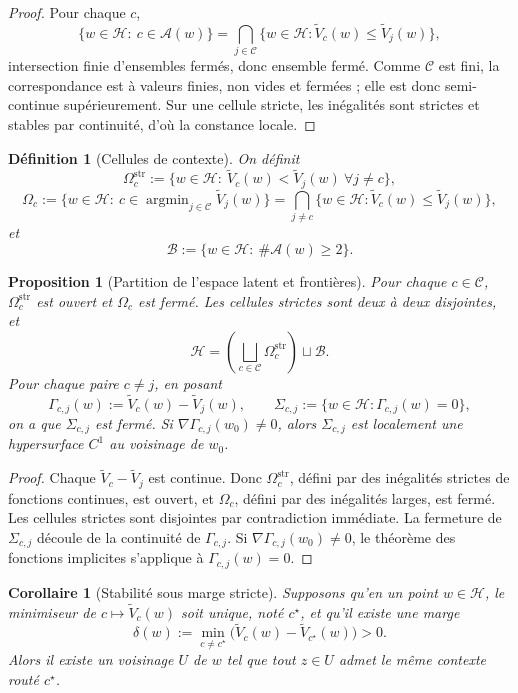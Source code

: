 \documentclass[11pt,a4paper]{article}
\newtheorem{definition}{Définition}[section]
\newtheorem{proposition}{Proposition}[section]
\newtheorem{corollary}{Corollaire}[section]
\DeclareMathOperator{\argmin}{argmin}
\newcommand{\Hh}{\mathcal H}
\newcommand{\Ccal}{\mathcal C}
\newcommand{\Acal}{\mathcal A}
\newcommand{\Bcal}{\mathcal B}
\begin{document}
\begin{proof}
Pour chaque \(c\),
\[
\{w\in\Hh:\ c\in\Acal(w)\}
=
\bigcap_{j\in\Ccal}\{w\in\Hh:\widetilde V_c(w)\le \widetilde V_j(w)\},
\]
intersection finie d'ensembles fermés, donc ensemble fermé. Comme \(\Ccal\) est fini, la correspondance est à valeurs finies, non vides et fermées ; elle est donc semi-continue supérieurement. Sur une cellule stricte, les inégalités sont strictes et stables par continuité, d'où la constance locale.
\end{proof}

\begin{definition}[Cellules de contexte]
On définit
\[
\Omega_c^{\mathrm{str}}:=\{w\in\Hh:\ \widetilde V_c(w)<\widetilde V_j(w)\ \forall j\neq c\},
\]
\[
\Omega_c:=\{w\in\Hh:\ c\in\argmin_{j\in\Ccal}\widetilde V_j(w)\}
=\bigcap_{j\neq c}\{w\in\Hh:\widetilde V_c(w)\le \widetilde V_j(w)\},
\]
et
\[
\Bcal:=\{w\in\Hh:\ \#\Acal(w)\ge 2\}.
\]
\end{definition}

\begin{proposition}[Partition de l'espace latent et frontières]
Pour chaque \(c\in\Ccal\), \(\Omega_c^{\mathrm{str}}\) est ouvert et \(\Omega_c\) est fermé. Les cellules strictes sont deux à deux disjointes, et
\[
\Hh=\left(\bigsqcup_{c\in\Ccal}\Omega_c^{\mathrm{str}}\right)\sqcup \Bcal.
\]
Pour chaque paire \(c\neq j\), en posant
\[
\Gamma_{c,j}(w):=\widetilde V_c(w)-\widetilde V_j(w),
\qquad
\Sigma_{c,j}:=\{w\in\Hh:\Gamma_{c,j}(w)=0\},
\]
on a que \(\Sigma_{c,j}\) est fermé. Si \(\nabla\Gamma_{c,j}(w_0)\neq 0\), alors \(\Sigma_{c,j}\) est localement une hypersurface \(C^1\) au voisinage de \(w_0\).
\end{proposition}

\begin{proof}
Chaque \(\widetilde V_c-\widetilde V_j\) est continue. Donc \(\Omega_c^{\mathrm{str}}\), défini par des inégalités strictes de fonctions continues, est ouvert, et \(\Omega_c\), défini par des inégalités larges, est fermé. Les cellules strictes sont disjointes par contradiction immédiate. La fermeture de \(\Sigma_{c,j}\) découle de la continuité de \(\Gamma_{c,j}\). Si \(\nabla\Gamma_{c,j}(w_0)\neq 0\), le théorème des fonctions implicites s'applique à \(\Gamma_{c,j}(w)=0\).
\end{proof}

\begin{corollary}[Stabilité sous marge stricte]
Supposons qu'en un point \(w\in\Hh\), le minimiseur de \(c\mapsto\widetilde V_c(w)\) soit unique, noté \(c^\star\), et qu'il existe une marge
\[
\delta(w):=\min_{c\neq c^\star}\bigl(\widetilde V_c(w)-\widetilde V_{c^\star}(w)\bigr)>0.
\]
Alors il existe un voisinage \(U\) de \(w\) tel que tout \(z\in U\) admet le même contexte routé \(c^\star\).
\end{corollary}
\end{document}
